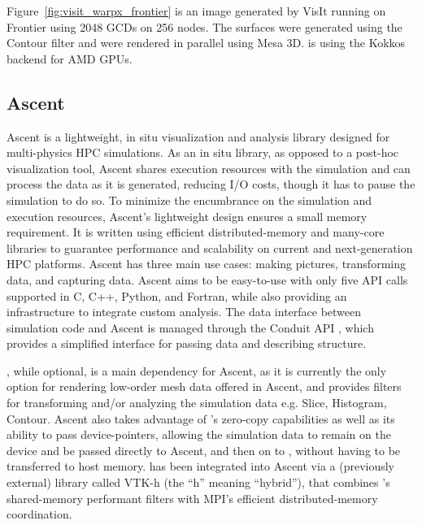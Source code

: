 Figure~\ref{fig:visit_warpx_frontier} is an image generated by VisIt running on Frontier using 2048 GCDs on 256 nodes.
The surfaces were generated using the \vtkm Contour filter and were rendered in parallel using Mesa 3D.
\vtkm is using the Kokkos backend for AMD GPUs.

\subsection{Ascent}

Ascent is a lightweight, in situ visualization and analysis library designed for multi-physics HPC simulations. As an in situ library, as opposed to a post-hoc visualization tool, Ascent shares execution resources with the simulation and can process the data as it is generated, reducing I/O costs, though it has to pause the simulation to do so. To minimize the encumbrance on the simulation and execution resources, Ascent's lightweight design ensures a small memory requirement. It is written using efficient distributed-memory and many-core libraries to guarantee performance and scalability on current and next-generation HPC platforms. Ascent has three main use cases: making pictures, transforming data, and capturing data. Ascent aims to be easy-to-use with only five API calls supported in C, C++, Python, and Fortran, while also providing an infrastructure to integrate custom analysis.
The data interface between simulation code and Ascent is managed through the Conduit API \cite{Harrison2022}, which provides a simplified interface for passing data and describing structure.

\vtkm, while optional, is a main dependency for Ascent, as it is currently the only option for rendering low-order mesh data offered in Ascent, and provides filters for transforming and/or analyzing the simulation data e.g.
Slice, Histogram, Contour.
Ascent also takes advantage of \vtkm's zero-copy capabilities as well as its ability to pass device-pointers, allowing the simulation data to remain on the device and be passed directly to Ascent, and then on to \vtkm, without having to be transferred to host memory.
\vtkm has been integrated into Ascent via a (previously external) library called VTK-h (the ``h'' meaning ``hybrid''), that combines \vtkm's shared-memory performant filters with MPI's efficient distributed-memory coordination. 

